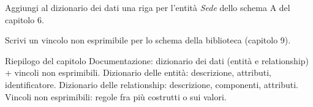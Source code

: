 \begin{esercizi}
\begin{passi}
  \item Aggiungi al dizionario dei dati una riga per l'entità \emph{Sede} dello schema A del capitolo 6.
  \item Scrivi un vincolo non esprimibile per lo schema della biblioteca (capitolo 9).
\end{passi}
\end{esercizi}

\begin{appunti}{Riepilogo del capitolo}
 Documentazione: dizionario dei dati (entità e relationship) + vincoli non esprimibili.
 Dizionario delle entità: descrizione, attributi, identificatore.
 Dizionario delle relationship: descrizione, componenti, attributi.
 Vincoli non esprimibili: regole fra più costrutti o sui valori.
\end{appunti}
